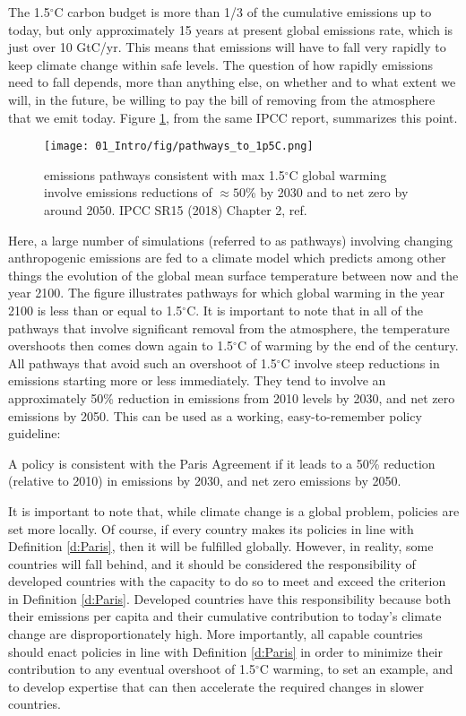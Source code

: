 The 1.5$^\circ$C carbon budget is more than 1/3 of the cumulative emissions up to today, but only approximately 15 years at present global emissions rate, which is just over 10 GtC/yr\cite{LeQuere2018}. This means that emissions will have to fall very rapidly to keep climate change within safe levels. The question of how rapidly emissions need to fall depends, more than anything else, on whether and to what extent we will, in the future, be willing to pay the bill of removing  from the atmosphere that we emit today. Figure \ref{fig:paths}, from the same IPCC report, summarizes this point. 
\begin{figure}[h!]
	\centering
	\texttt{[image: 01\_Intro/fig/pathways\_to\_1p5C.png]}
	\caption{ emissions pathways consistent with max 1.5$^\circ$C global warming involve emissions reductions of $\approx 50$\% by 2030 and to net zero by around 2050. IPCC SR15 (2018) Chapter 2, ref. \cite{IPCC2018_ch2}}
	\label{fig:paths}
\end{figure}

Here, a large number of simulations (referred to as pathways) involving changing anthropogenic emissions are fed to a climate model which predicts among other things the evolution of the global mean surface temperature between now and the year 2100. The figure illustrates pathways for which global warming in the year 2100 is less than or equal to 1.5$^\circ$C. It is important to note that in all of the pathways that involve significant  removal from the atmosphere, the temperature overshoots then comes down again to 1.5$^\circ$C of warming by the end of the century. All pathways that avoid such an overshoot of 1.5$^\circ$C involve steep reductions in emissions starting more or less immediately. They tend to involve an approximately 50\% reduction in  emissions from 2010 levels by 2030, and net zero emissions by 2050\cite{IPCC2018_ch2}. This can be used as a working, easy-to-remember policy guideline:
\begin{definition}
A policy is consistent with the Paris Agreement if it leads to a 50\% reduction (relative to 2010) in  emissions by 2030, and net zero emissions by 2050. \label{d:Paris}
\end{definition}

It is important to note that, while climate change is a global problem, policies are set more locally. Of course, if every country makes its policies in line with Definition \ref{d:Paris}, then it will be fulfilled globally. However, in reality, some countries will fall behind, and it should be considered the responsibility of developed countries with the capacity to do so to meet and exceed the criterion in Definition \ref{d:Paris}. Developed countries have this responsibility because both their emissions per capita and their cumulative contribution to today's climate change are disproportionately high\cite{Ritchie2019a}. More importantly, all capable countries should enact policies in line with Definition \ref{d:Paris} in order to minimize their contribution to any eventual overshoot of 1.5$^\circ$C warming, to set an example, and to develop expertise that can then accelerate the required changes in slower countries.

